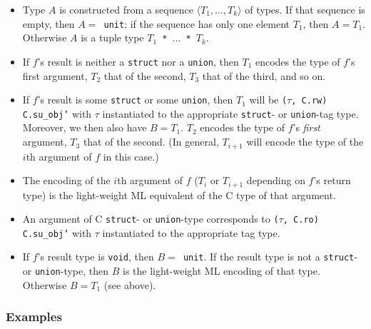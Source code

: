 \documentclass[titlepage,letterpaper]{article}
\begin{document}
\begin{itemize}
\item Type $A$ is constructed from a sequence $\langle T_1, \ldots,
  T_k \rangle$ of types.  If that sequence is empty, then {\tt $A =$
    unit}; if the sequence has only one element $T_1$, then $A = T_1$.
  Otherwise $A$ is a tuple type {\tt $T_1$ * $\ldots$ * $T_k$}.
\item If $f$'s result is neither a {\tt struct} nor a {\tt union},
  then $T_1$ encodes the type of $f$'s first argument, $T_2$ that of
  the second, $T_3$ that of the third, and so on.
\item If $f$'s result is some {\tt struct} or some {\tt union}, then
  $T_1$ will be {\tt ($\tau$, C.rw) C.su\_obj'} with $\tau$
  instantiated to the appropriate {\tt struct}- or {\tt union}-tag
  type.  Moreover, we then also have $B = T_1$. $T_2$ encodes the type
  of $f$'s {\em first} argument, $T_3$ that of the second.  (In
  general, $T_{i+1}$ will encode the type of the $i$th argument of
  $f$ in this case.)
\item The encoding of the $i$th argument of $f$ ($T_i$ or $T_{i+1}$
  depending on $f$'s return type) is the light-weight ML equivalent of
  the C type of that argument.
\item An argument of C {\tt struct}- or {\tt union}-type corresponds
  to {\tt ($\tau$, C.ro) C.su\_obj'} with $\tau$ instantiated to the
  appropriate tag type.
\item If $f$'s result type is {\tt void}, then {\tt $B =$ unit}.  If
  the result type is not a {\tt struct}- or {\tt union}-type, then $B$
  is the light-weight ML encoding of that type.  Otherwise $B = T_1$
  (see above).
\end{itemize}

\subsubsection*{Examples}
\end{document}

